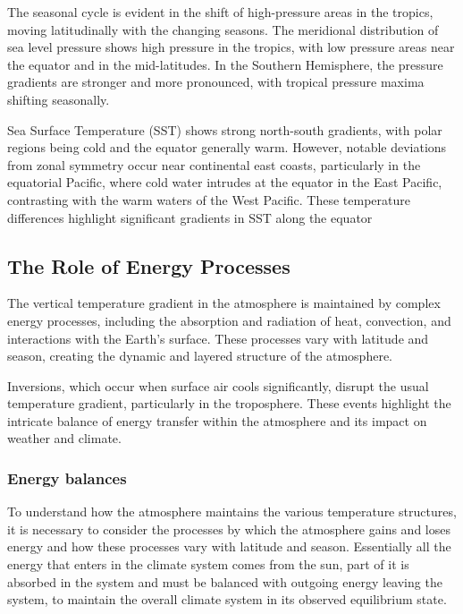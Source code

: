 The seasonal cycle is evident in the shift of high-pressure areas in the tropics, moving latitudinally with the changing seasons. The meridional distribution of sea level pressure shows high pressure in the tropics, with low pressure areas near the equator and in the mid-latitudes. In the Southern Hemisphere, the pressure gradients are stronger and more pronounced, with tropical pressure maxima shifting seasonally.

Sea Surface Temperature (SST) shows strong north-south gradients, with polar regions being cold and the equator generally warm. However, notable deviations from zonal symmetry occur near continental east coasts, particularly in the equatorial Pacific, where cold water intrudes at the equator in the East Pacific, contrasting with the warm waters of the West Pacific. These temperature differences highlight significant gradients in SST along the equator



\subsection*{The Role of Energy Processes}

The vertical temperature gradient in the atmosphere is maintained by complex energy processes, including the absorption and radiation of heat, convection, and interactions with the Earth's surface. These processes vary with latitude and season, creating the dynamic and layered structure of the atmosphere.

Inversions, which occur when surface air cools significantly, disrupt the usual temperature gradient, particularly in the troposphere. These events highlight the intricate balance of energy transfer within the atmosphere and its impact on weather and climate.

\subsubsection{Energy balances }
To understand how the atmosphere maintains the various temperature structures, it is necessary to consider the processes by which the atmosphere gains and loses energy and how these processes vary with latitude and season. Essentially all the energy that enters in the climate system comes from the sun, part of it is absorbed in the system and must be balanced with outgoing energy leaving the system, to maintain the overall climate system in its observed equilibrium state.

